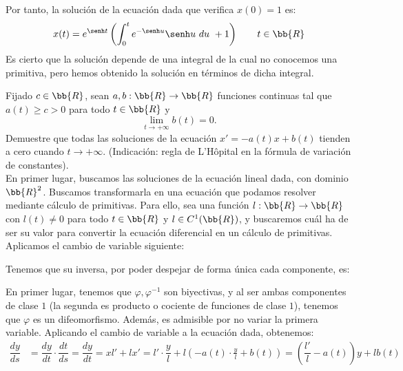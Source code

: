 \begin{ejercicio}
\begin{enumerate}
        Por tanto, la solución de la ecuación dada que verifica $x(0)=1$ es:
        \begin{equation*}
            x(t) = e^{\senh t}\left(\int_0^t e^{-\senh u}\senh u~du~+ 1\right) \qquad t\in \bb{R}
        \end{equation*}
        Es cierto que la solución depende de una integral de la cual no conocemos una primitiva, pero hemos obtenido la solución en términos de dicha integral.


    \end{enumerate}
\end{ejercicio}

\begin{ejercicio}
    Fijado $c\in \bb{R}$, sean $a, b : \bb{R} \to \bb{R}$ funciones continuas tal que $a(t) \geq c > 0$ para todo $t\in \bb{R}$ y
    \begin{equation*}
        \lim_{t \to +\infty} b(t) = 0.
    \end{equation*}
    Demuestre que todas las soluciones de la ecuación $x' = -a(t)x + b(t)$ tienden a cero cuando $t \to +\infty$. (Indicación: regla de L'Hôpital en la fórmula de variación de constantes).\\

    En primer lugar, buscamos las soluciones de la ecuación lineal dada, con dominio $\bb{R}^2$.
    Buscamos transformarla en una ecuación que podamos resolver mediante cálculo de primitivas.
    Para ello, sea una función $l:\bb{R}\to \bb{R}$ con $l(t)\neq 0$ para todo $t\in \bb{R}$ y $l\in C^1(\bb{R})$, y buscaremos cuál ha de ser su valor para convertir la ecuación diferencial en un cálculo de primitivas.
    Aplicamos el cambio de variable siguiente:

    Tenemos que su inversa, por poder despejar de forma única cada componente, es:

    En primer lugar, tenemos que $\varphi,\varphi^{-1}$ son biyectivas, y al ser ambas componentes de clase $1$ (la segunda es producto o cociente de funciones de clase $1$), tenemos que $\varphi$ es un difeomorfismo. Además, es admisible por no variar la primera variable.
    Aplicando el cambio de variable a la ecuación dada, obtenemos:
    \begin{align*}
        \dfrac{dy}{ds} &= \dfrac{dy}{dt}\cdot \dfrac{dt}{ds} = \dfrac{dy}{dt} = xl' + lx' = l'\cdot \dfrac{y}{l} + l\left(-a(t)\cdot \frac{y}{l} + b(t)\right)
        = \left(\dfrac{l'}{l} -a(t)\right)y + lb(t)
    \end{align*}


\end{ejercicio}
